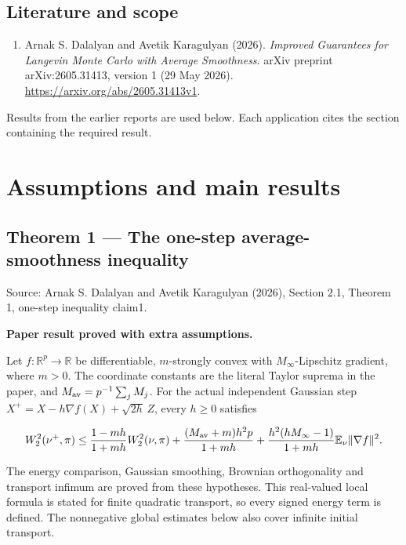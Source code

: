 \documentclass[11pt,a4paper]{report}
\begin{document}
\section*{Literature and scope}
\begin{enumerate}
\item Arnak S. Dalalyan and Avetik Karagulyan (2026). \emph{Improved Guarantees for Langevin Monte Carlo with Average Smoothness}. arXiv preprint arXiv:2605.31413, version 1 (29 May 2026). \url{https://arxiv.org/abs/2605.31413v1}.
\end{enumerate}
Results from the earlier reports \cite{LangevinLean2026ULASC,LangevinLean2026ULALSI,LangevinLean2026IPLA,LangevinLean2026Proximal} are used below. Each application cites the section containing the required result.

\tableofcontents
\clearpage
{}
\chapter{Assumptions and main results}
\section{\texorpdfstring{Theorem 1 — The one-step average-smoothness inequality}{Theorem 1 — The one-step average-smoothness inequality}}


Source: Arnak S. Dalalyan and Avetik Karagulyan (2026), Section 2.1, Theorem 1, one-step inequality claim1.



\textbf{Paper result proved with extra assumptions.}



Let \(f:\mathbb R^p\to\mathbb R\) be differentiable,
\(m\)-strongly convex with \(M_\infty\)-Lipschitz gradient, where
\(m>0\). The coordinate constants are the literal Taylor suprema in the
paper, and \(M_{\rm av}=p^{-1}\sum_j M_j\). For the actual independent
Gaussian step \(X^+=X-h\nabla f(X)+\sqrt{2h}\,Z\), every \(h\ge0\) satisfies


\[W_2^2(\nu^+,\pi)\le
\frac{1-mh}{1+mh}W_2^2(\nu,\pi)+
\frac{(M_{\rm av}+m)h^2p}{1+mh}+
\frac{h^2(hM_\infty-1)}{1+mh}\mathbb E_\nu\|\nabla f\|^2.\]


The energy comparison, Gaussian smoothing, Brownian orthogonality and
transport infimum are proved from these hypotheses. This real-valued local
formula is stated for finite quadratic transport, so every signed energy term
is defined. The nonnegative global estimates below also cover infinite
initial transport.
\end{document}
